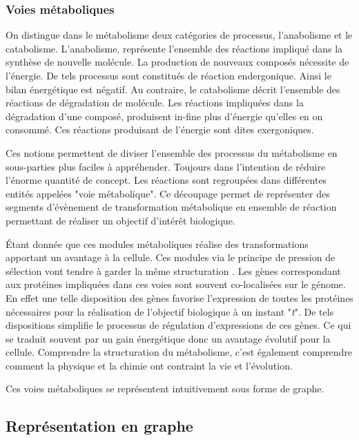 \begin{refsection}
    
    \subsubsection{Voies métaboliques}
    On distingue dans le métabolisme deux catégories de processus, l'anabolisme et le catabolisme. L'anabolisme, représente l'ensemble des réactions impliqué dans la synthèse de nouvelle molécule. La production de nouveaux composés nécessite de l'énergie. De tels processus sont constitués de réaction endergonique. Ainsi le bilan énergétique est négatif.  Au contraire, le catabolisme décrit l'ensemble des réactions de dégradation de molécule. Les réactions impliquées dans la dégradation d'une composé, produisent in-fine plus d'énergie qu'elles en on consommé. Ces réactions produisant de l'énergie sont dites exergoniques.
    
    Ces notions permettent de diviser l'ensemble des processus du métabolisme en sous-parties plus faciles à appréhender. Toujours dans l'intention de réduire l'énorme quantité de concept. Les réactions sont regroupées dans différentes entités appelées "voie métabolique". Ce découpage permet de représenter des segments d'évènement de transformation métabolique en ensemble de réaction permettant de réaliser un objectif d'intérêt biologique.
    
    Étant donnée que ces modules métaboliques réalise des transformations apportant un avantage à la cellule. Ces modules via le principe de pression de sélection vont tendre à garder la même structuration \cite{braakman2012compositional}. Les gènes correspondant aux protéines impliquées dans ces voies sont souvent co-localisées sur le génome. En effet une telle disposition des gènes favorise l'expression de toutes les protéines nécessaires pour la réalisation de l'objectif biologique à un instant "\textit{t}". De tels dispositions simplifie le processus de régulation d'expressions de ces gènes. Ce qui se traduit souvent par un gain énergétique donc un avantage évolutif pour la cellule. Comprendre la structuration du métabolisme, c'est également comprendre comment la physique et la chimie ont contraint la vie et l'évolution.
    
    Ces voies métaboliques se représentent intuitivement sous forme de graphe.
    
    \subsection{Représentation en graphe}
    

\end{refsection}
